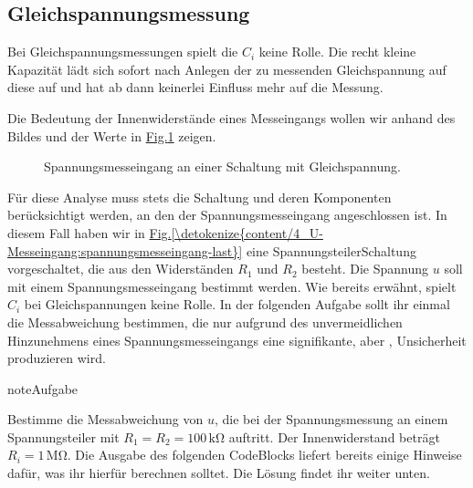 \documentclass[letterpaper,10pt,english]{jupyterBook}
\let\sphinxpxdimen\pdfpxdimen\else\newdimen\sphinxpxdimen
\begin{document}
\subsection{Gleichspannungsmessung}
\label{\detokenize{content/4_U-Messeingang:gleichspannungsmessung}}
\sphinxAtStartPar
Bei Gleichspannungsmessungen spielt die  \(C_i\) keine Rolle.
Die recht kleine Kapazität lädt sich sofort nach Anlegen der zu messenden Gleichspannung auf diese auf und hat ab dann keinerlei Einfluss mehr auf die Messung.

\sphinxAtStartPar
Die Bedeutung der Innenwiderstände eines Messeingangs wollen wir anhand des Bildes und der Werte in \hyperref[\detokenize{content/4_U-Messeingang:spannungsmesseingang-gleich}]{Fig.\@ \ref{\detokenize{content/4_U-Messeingang:spannungsmesseingang-gleich}}} zeigen.

\begin{figure}[htbp]
\centering
\capstart

\noindent\sphinxincludegraphics[width=400\sphinxpxdimen]{{spannungsmesseingang_gleich}.jpg}
\caption{Spannungsmesseingang an einer Schaltung mit Gleichspannung.}\label{\detokenize{content/4_U-Messeingang:spannungsmesseingang-gleich}}\end{figure}

\sphinxAtStartPar
Für diese Analyse muss stets die Schaltung und deren Komponenten berücksichtigt werden, an den der Spannungsmesseingang angeschlossen ist. In diesem Fall haben wir in \hyperref[\detokenize{content/4_U-Messeingang:spannungsmesseingang-last}]{Fig.\@ \ref{\detokenize{content/4_U-Messeingang:spannungsmesseingang-last}}} eine Spannungsteiler\sphinxhyphen{}Schaltung vorgeschaltet, die aus den Widerständen \(R_1\) und \(R_2\) besteht. Die Spannung \(u\) soll mit einem Spannungsmesseingang bestimmt werden. Wie bereits erwähnt, spielt \(C_i\) bei Gleichspannungen keine Rolle. In der folgenden Aufgabe sollt ihr einmal die Messabweichung bestimmen, die nur aufgrund des unvermeidlichen Hinzunehmens eines Spannungsmesseingangs eine signifikante, aber , Unsicherheit produzieren wird.

\begin{sphinxadmonition}{note}{Aufgabe}

\sphinxAtStartPar
Bestimme die Messabweichung von \(u\), die bei der Spannungsmessung an einem Spannungsteiler mit \(R_1 = R_2 = 100\,\mathrm{k\Omega}\) auftritt. Der Innenwiderstand beträgt \(R_i = 1\,\mathrm{M\Omega}\). Die Ausgabe des folgenden Code\sphinxhyphen{}Blocks liefert bereits einige Hinweise dafür, was ihr hierfür berechnen solltet. Die Lösung findet ihr weiter unten.
\end{sphinxadmonition}
\end{document}
